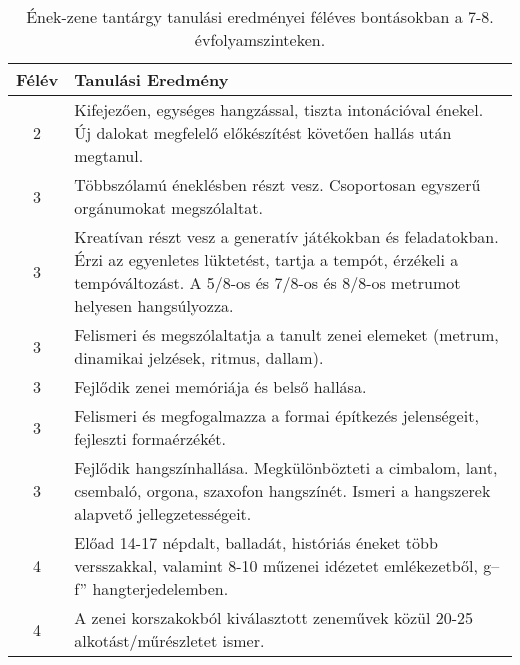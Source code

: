        
           \begin{longtable}{c | p{12cm} }
            \caption[Ének-zene 7-8.]{Ének-zene tantárgy tanulási eredményei féléves bontásokban a 7-8. évfolyamszinteken. }  \\

            \textbf{Félév} & \textbf{Tanulási Eredmény} \\
            \hline
            \endhead
                                
                                          2 &  Kifejezően, egységes hangzással, tiszta intonációval énekel. Új dalokat megfelelő előkészítést követően hallás után megtanul. \\ \hline
                                      
                                
                                          3 &  Többszólamú éneklésben részt vesz. Csoportosan egyszerű orgánumokat megszólaltat. \\ \hline
                                          3 &  Kreatívan  részt vesz a generatív játékokban és feladatokban. Érzi az egyenletes lüktetést, tartja a tempót, érzékeli a tempóváltozást. A 5/8-os és 7/8-os és 8/8-os metrumot helyesen hangsúlyozza. \\ \hline
                                          3 &  Felismeri és megszólaltatja a tanult zenei elemeket (metrum, dinamikai jelzések, ritmus, dallam). \\ \hline
                                          3 &  Fejlődik zenei memóriája és belső hallása. \\ \hline
                                          3 &  Felismeri és megfogalmazza a formai építkezés jelenségeit, fejleszti formaérzékét. \\ \hline
                                          3 &  Fejlődik hangszínhallása. Megkülönbözteti a cimbalom, lant, csembaló, orgona, szaxofon hangszínét. Ismeri a hangszerek alapvető jellegzetességeit. \\ \hline
                                      
                                
                                          4 &  Előad 14-17 népdalt, balladát, históriás éneket több versszakkal, valamint 8-10 műzenei idézetet emlékezetből, g–f” hangterjedelemben. \\ \hline
                                          4 &  A zenei korszakokból kiválasztott zeneművek közül 20-25 alkotást/műrészletet ismer. \\ \hline
                                      
                        \end{longtable}
            \clearpage

